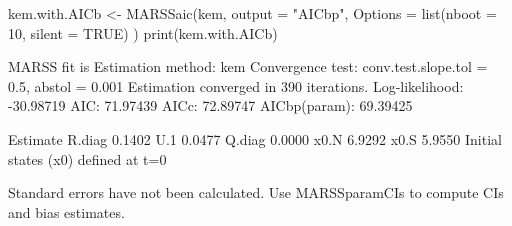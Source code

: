 \begin{Schunk}
\begin{Sinput}
 kem.with.AICb <- MARSSaic(kem,
   output = "AICbp",
   Options = list(nboot = 10, silent = TRUE)
 )
 print(kem.with.AICb)
\end{Sinput}
\begin{Soutput}
MARSS fit is
Estimation method: kem 
Convergence test: conv.test.slope.tol = 0.5, abstol = 0.001
Estimation converged in 390 iterations. 
Log-likelihood: -30.98719 
AIC: 71.97439   AICc: 72.89747   AICbp(param): 69.39425   
 
       Estimate
R.diag   0.1402
U.1      0.0477
Q.diag   0.0000
x0.N     6.9292
x0.S     5.9550
Initial states (x0) defined at t=0

Standard errors have not been calculated. 
Use MARSSparamCIs to compute CIs and bias estimates.
\end{Soutput}
\end{Schunk}
